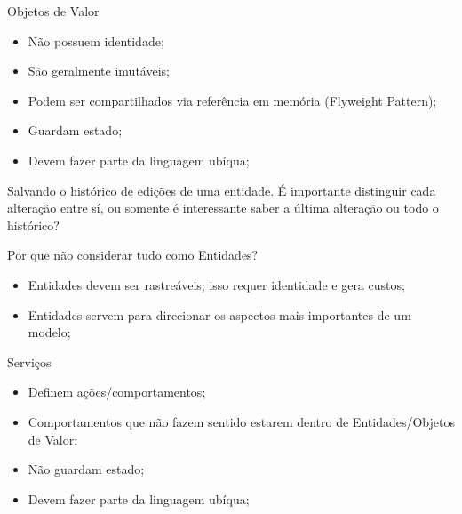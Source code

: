 \documentclass[aspectratio=169]{beamer}
\begin{document}
\begin{frame}{Objetos de Valor}	
	\begin{itemize}	
		\item Não possuem identidade;
		\item São geralmente imutáveis;
		\item Podem ser compartilhados via referência em memória (Flyweight Pattern);
		\item Guardam estado;
		\item Devem fazer parte da linguagem ubíqua;
	\end{itemize}

	Salvando o histórico de edições de uma entidade. É importante distinguir cada alteração entre sí, ou somente é interessante saber a última alteração ou todo o histórico?
\end{frame}

\begin{frame}{Por que não considerar tudo como Entidades?}	
	\begin{itemize}	
		\item Entidades devem ser rastreáveis, isso requer identidade e gera custos;
		\item Entidades servem para direcionar os aspectos mais importantes de um modelo;
	\end{itemize}
\end{frame}

\begin{frame}{Serviços}	
	\begin{itemize}	
		\item Definem ações/comportamentos;
		\item Comportamentos que não fazem sentido estarem dentro de Entidades/Objetos de Valor;
		\item Não guardam estado;
		\item Devem fazer parte da linguagem ubíqua;
	\end{itemize}
\end{frame}
\end{document}
